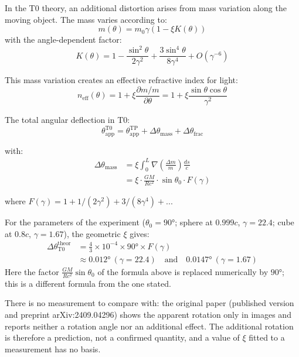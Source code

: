 	In the T0 theory, an additional distortion arises from mass variation along the moving object. The mass varies according to:
	\begin{equation}
		m(\theta) = m_0\gamma\left(1 - \xi K(\theta)\right)
	\end{equation}
	with the angle-dependent factor:
	\begin{equation}
		K(\theta) = 1 - \frac{\sin^2\theta}{2\gamma^2} + \frac{3\sin^4\theta}{8\gamma^4} + O(\gamma^{-6})
	\end{equation}
	
	This mass variation creates an effective refractive index for light:
	\begin{equation}
		n_{\text{eff}}(\theta) = 1 + \xi \frac{\partial m/m}{\partial \theta} = 1 + \xi \frac{\sin\theta\cos\theta}{\gamma^2}
	\end{equation}
	
	The total angular deflection in T0:
	\begin{equation}
		\theta_{\text{app}}^{\text{T0}} = \theta_{\text{app}}^{\text{TP}} + \Delta\theta_{\text{mass}} + \Delta\theta_{\text{frac}}
	\end{equation}
	
	with:
	\begin{align}
		\Delta\theta_{\text{mass}} &= \xi \int_0^L \nabla\left(\frac{\Delta m}{m}\right) \frac{ds}{c} \\
		&= \xi \cdot \frac{GM}{Rc^2} \cdot \sin\theta_0 \cdot F(\gamma)
	\end{align}
	
	where $F(\gamma) = 1 + 1/(2\gamma^2) + 3/(8\gamma^4) + ...$ 
	
	For the parameters of the experiment ($\theta_0 = 90°$; sphere at $0.999c$, $\gamma = 22.4$; cube at $0.8c$, $\gamma = 1.67$), the geometric $\xi$ gives:
	\begin{align}
		\Delta\theta_{\text{T0}}^{\text{theor}} &= \frac{4}{3} \times 10^{-4} \times 90° \times F(\gamma) \\
		&\approx 0.012° \ (\gamma = 22.4) \quad \text{and} \quad 0.0147° \ (\gamma = 1.67)
	\end{align}
	Here the factor $\frac{GM}{Rc^2}\sin\theta_0$ of the formula above is replaced numerically by $90°$; this is a different formula from the one stated.
	
	There is no measurement to compare with: the original paper \cite{terrell2025} (published version and preprint arXiv:2409.04296) shows the apparent rotation only in images and reports neither a rotation angle nor an additional effect. The additional rotation is therefore a prediction, not a confirmed quantity, and a value of $\xi$ fitted to a measurement has no basis.
	
